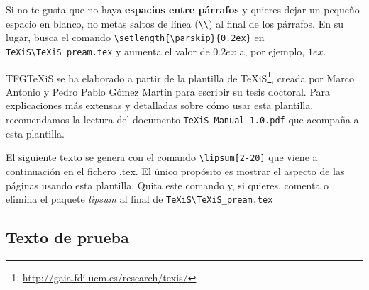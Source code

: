 Si no te gusta que no haya \textbf{espacios entre párrafos} y quieres dejar un pequeño espacio en blanco, no metas saltos de línea (\verb|\\|) al final de los párrafos. En su lugar, busca el comando  \verb|\setlength{\parskip}{0.2ex}| en \verb|TeXiS\TeXiS_pream.tex| y aumenta el valor de $0.2ex$ a, por ejemplo, $1ex$.

TFGTeXiS se ha elaborado a partir de la plantilla de TeXiS\footnote{\url{http://gaia.fdi.ucm.es/research/texis/}}, creada por Marco Antonio y Pedro Pablo Gómez Martín para escribir su tesis doctoral. Para explicaciones más extensas y detalladas sobre cómo usar esta plantilla, recomendamos la lectura del documento \texttt{TeXiS-Manual-1.0.pdf} que acompaña a esta plantilla.

El siguiente texto se genera con el comando \verb|\lipsum[2-20]| que viene a continuación en el fichero .tex. El único propósito es mostrar el aspecto de las páginas usando esta plantilla. Quita este comando y, si quieres, comenta o elimina el paquete \textit{lipsum} al final de \verb|TeXiS\TeXiS_pream.tex|

\subsection{Texto de prueba}


\lipsum[2-20]